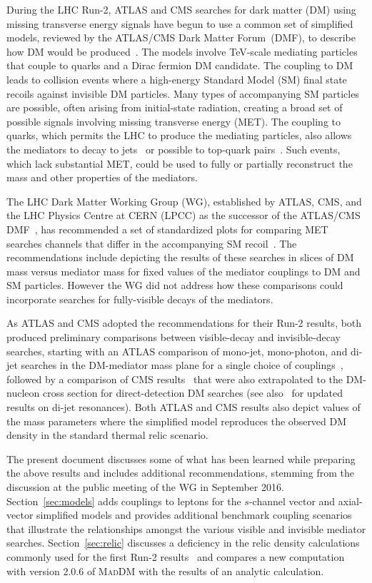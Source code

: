 \documentclass[review]{elsarticle}
\newcommand{\maddm}{\textsc{MadDM}\xspace}
\begin{document}
During the LHC Run-2, ATLAS and CMS searches for dark matter (DM) using missing transverse energy signals have begun to use a common set of simplified models, reviewed by the ATLAS/CMS Dark Matter Forum~(DMF), to describe how DM would be produced~\cite{Abercrombie:2015wmb}. The models involve TeV-scale mediating particles that couple to quarks and a Dirac fermion DM candidate. The coupling to DM leads to collision events where a high-energy Standard Model (SM) final state recoils against invisible DM particles. Many types of accompanying SM particles are possible, often arising from initial-state radiation, creating a broad set of possible signals involving missing transverse energy (MET). The coupling to quarks, which permits the LHC to produce the mediating particles, also allows the mediators to decay to jets~\cite{Dreiner:2013vla,Chala:2015ama,Fairbairn:2016iuf} or possible to top-quark pairs~\cite{Chala:2015ama,Aaboud:2017hnm,Bauer:2017ota}. Such events, which lack substantial MET, could be used to fully or partially reconstruct the mass and other properties of the mediators.

The LHC Dark Matter Working Group (WG), established by ATLAS, CMS, and the LHC Physics Centre at CERN (LPCC) as the successor of the ATLAS/CMS DMF~\cite{Abercrombie:2015wmb}, has recommended a set of standardized plots for comparing MET searches channels that differ in the accompanying SM recoil~\cite{Boveia:2016mrp}. The recommendations include depicting the results of these searches in slices of DM mass versus mediator mass for fixed values of the mediator couplings to DM and SM particles. However the WG did not address how these comparisons could incorporate searches for fully-visible decays of the mediators.

As ATLAS and CMS adopted the recommendations for their Run-2 results, both produced preliminary comparisons between visible-decay and invisible-decay searches, starting with an ATLAS comparison of mono-jet, mono-photon, and di-jet searches in the DM-mediator mass plane for a single choice of couplings~\cite{ATLASsummaryplots}, followed by a  comparison of CMS results~\cite{CMS_SummaryPlots_ICHEP} that were also extrapolated to the DM-nucleon cross section for direct-detection DM searches (see also~\cite{Sirunyan:2016iap} for updated results on di-jet resonances). Both ATLAS and CMS results also depict values of the mass parameters where the simplified model reproduces the observed DM density in the standard thermal relic scenario.

The present document discusses some of what has been learned while preparing the above results and includes additional recommendations, stemming from the discussion at the public meeting of the WG in September 2016. Section~\ref{sec:models} adds couplings to leptons for the $s$-channel vector and axial-vector simplified models and provides additional benchmark coupling scenarios that illustrate the relationships amongst the various visible and invisible mediator searches. Section~\ref{sec:relic} discusses a deficiency in the relic density calculations commonly used for the first Run-2 results~\cite{Boveia:2016mrp,ATLASsummaryplots,CMS_SummaryPlots_ICHEP} and compares a new computation with version 2.0.6 of \maddm with the results of an analytic calculation. 
\end{document}
